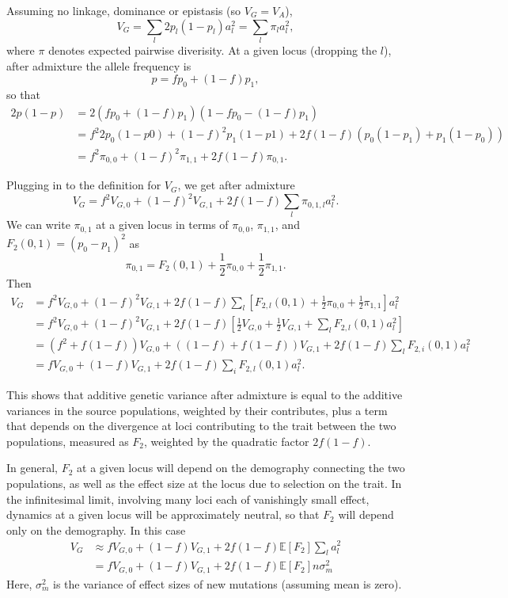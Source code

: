 \documentclass{article}
\begin{document}
Assuming no linkage, dominance or epistasis (so \(V_G=V_A\)),
\[V_G = \sum_l 2p_l(1-p_l)a_l^2 = \sum_l \pi_l a_l^2,\]
where $\pi$ denotes expected pairwise diverisity.
At a given locus (dropping the $l$), after admixture the allele frequency is
\[p=f p_0 + (1-f) p_1,\]
so that
\begin{align*}
    2p(1-p) & = 2(f p_0 + (1-f) p_1)(1 - f p_0 - (1-f) p_1) \\
    & = f^2 2p_0(1-p0) + (1-f)^2 p_1(1-p1) + 2f(1-f) (p_0(1-p_1) + p_1(1-p_0)) \\
    & = f^2 \pi_{0,0} + (1-f)^2 \pi_{1,1} + 2f(1-f)\pi_{0,1}.
\end{align*}

Plugging in to the definition for $V_G$, we get after admixture
\[V_G = f^2 V_{G,0} + (1-f)^2 V_{G,1} + 2f(1-f)\sum_l \pi_{0,1,l}a_l^2.\]
We can write $\pi_{0,1}$ at a given locus in terms of $\pi_{0,0}$, $\pi_{1,1}$,
and $F_2(0,1)=(p_0-p_1)^2$ as \citep{peter2016admixture}
\[\pi_{0,1} = F_2(0,1) + \frac{1}{2}\pi_{0,0} + \frac{1}{2}\pi_{1,1}.\]
Then
\begin{align*}
    V_G & = f^2 V_{G,0} + (1-f)^2 V_{G,1} + 2f(1-f)\sum_l \left[F_{2,l}(0,1)
    + \frac{1}{2}\pi_{0,0} + \frac{1}{2}\pi_{1,1}\right] a_l^2 \\
    & = f^2 V_{G,0} + (1-f)^2 V_{G,1} + 2f(1-f)\left[\frac{1}{2}V_{G,0} 
    + \frac{1}{2}V_{G,1} + \sum_l F_{2,l}(0,1)a_l^2\right] \\
    & = \left(f^2 + f(1-f)\right) V_{G,0} + \left((1-f) + f(1-f)\right)V_{G,1}
    + 2f(1-f) \sum_l F_{2,i}(0,1)a_l^2 \\
    & = f V_{G,0} + (1-f)V_{G,1} + 2f(1-f)\sum_i F_{2,l}(0,1)a_l^2.
\end{align*}

This shows that additive genetic variance after admixture is equal to the
additive variances in the source populations, weighted by their contributes,
plus a term that depends on the divergence at loci contributing to the trait
between the two populations, measured as $F_2$, weighted by the quadratic
factor $2f(1-f)$.

In general, $F_2$ at a given locus will depend on the demography connecting the
two populations, as well as the effect size at the locus due to selection on
the trait. In the infinitesimal limit, involving many loci each of vanishingly
small effect, dynamics at a given locus will be approximately neutral, so that
$F_2$ will depend only on the demography. In this case
\begin{align*}
    V_G & \approx f V_{G,0} + (1-f) V_{G,1} + 2f(1-f)\mathbb{E}[F_2] \sum_l a_l^2 \\
    & = f V_{G,0} + (1-f) V_{G,1} + 2f(1-f)\mathbb{E}[F_2] n \sigma_m^2
\end{align*}
Here, $\sigma_m^2$ is the variance of effect sizes of new mutations (assuming mean is
zero).
\end{document}
